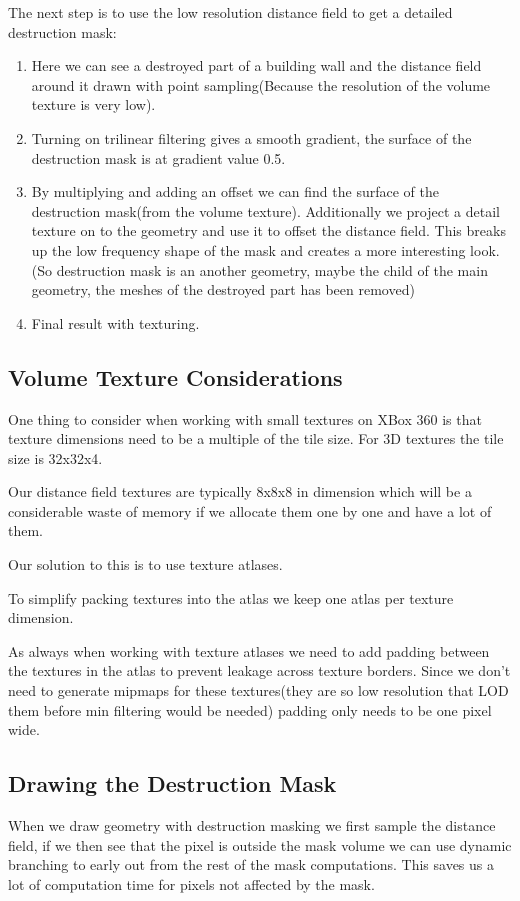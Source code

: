 The next step is to use the low resolution distance field to get a detailed destruction mask:
\begin{enumerate}
	\item Here we can see a destroyed part of a building wall and the distance field around it drawn with point sampling(Because the resolution of the volume texture is very low).
	\item Turning on trilinear filtering gives a smooth gradient, the surface of the destruction mask is at gradient value 0.5.
	\item By multiplying and adding an offset we can find the surface of the destruction mask(from the volume texture). Additionally we project a detail texture on to the geometry and use it to offset the distance field. This breaks up the low frequency shape of the mask and creates a more interesting look.(So destruction mask is an another geometry, maybe the child of the main geometry, the meshes of the destroyed part has been removed)
	\item Final result with texturing. 
\end{enumerate}


\subsection{Volume Texture Considerations}
One thing to consider when working with small textures on XBox 360 is that texture dimensions need to be a multiple of the tile size. For 3D textures the tile size is 32x32x4.

Our distance field textures are typically 8x8x8 in dimension which will be a considerable waste of memory if we allocate them one by one and have a lot of them.

Our solution to this is to use texture atlases.

To simplify packing textures into the atlas we keep one atlas per texture dimension.

As always when working with texture atlases we need to add padding between the textures in the atlas to prevent leakage across texture borders. Since we don't need to generate mipmaps for these textures(they are so low resolution that LOD them before min filtering would be needed) padding only needs to be one pixel wide.

\subsection{Drawing the Destruction Mask}
When we draw geometry with destruction masking we first sample the distance field, if we then see that the pixel is outside the mask volume we can use dynamic branching to early out from the rest of the mask computations. This saves us a lot of computation time for pixels not affected by the mask.


